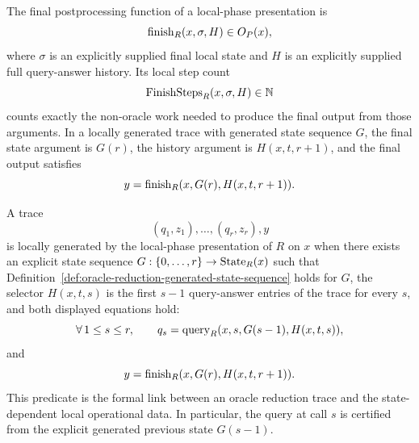\begin{definition}
  \label{def:oracle-reduction-final-postprocessing}
  The final postprocessing function of a local-phase presentation is
  \[
    \operatorname{finish}_R(x,\sigma,H)\in O_P(x),
  \]
  where $\sigma$ is an explicitly supplied final local state and $H$ is an
  explicitly supplied full query-answer history.  Its local step count
  \[
    \operatorname{FinishSteps}_R(x,\sigma,H)\in\mathbb{N}
  \]
  counts exactly the non-oracle work needed to produce the final output from
  those arguments.  In a locally generated trace with generated state sequence
  $G$, the final state argument is $G(r)$, the history argument is
  $H(x,t,r+1)$, and the final output satisfies
  \[
    y=\operatorname{finish}_R(x,G(r),H(x,t,r+1)).
  \]
\end{definition}

\begin{definition}
  \label{def:oracle-reduction-local-trace-consistency}
  A trace
  \[
    (q_1,z_1),\ldots,(q_r,z_r),y
  \]
  is locally generated by the local-phase presentation of $R$ on $x$ when
  there exists an explicit state sequence
  $G:\{0,\ldots,r\}\to\operatorname{State}_R(x)$ such that
  Definition~\ref{def:oracle-reduction-generated-state-sequence} holds for
  $G$, the selector $H(x,t,s)$ is the first $s-1$ query-answer entries of the
  trace for every $s$, and both displayed equations hold:
  \[
    \forall\,1\leq s\leq r,\qquad
    q_s=\operatorname{query}_R(x,s,G(s-1),H(x,t,s)),
  \]
  and
  \[
    y=\operatorname{finish}_R(x,G(r),H(x,t,r+1)).
  \]
  This predicate is the formal link between an oracle reduction trace and the
  state-dependent local operational data.  In particular, the query at call
  $s$ is certified from the explicit generated previous state $G(s-1)$.
\end{definition}


